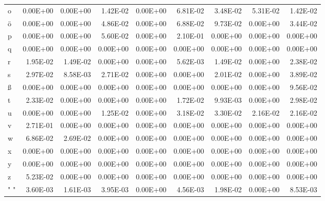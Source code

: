 \documentclass[11pt,a4paper]{CLabBookTemplate} %
\begin{document}
\begin{table}[htbp]
\begin{tabular}{lrrrrrrrr}
		o     & 0.00E+00 & 0.00E+00 & 1.42E-02 & 0.00E+00 & 6.81E-02 & 3.48E-02 & 5.31E-02 & 1.42E-02 \\
		ö     & 0.00E+00 & 0.00E+00 & 4.86E-02 & 0.00E+00 & 6.88E-02 & 9.73E-02 & 0.00E+00 & 3.44E-02 \\
		p     & 0.00E+00 & 0.00E+00 & 5.60E-02 & 0.00E+00 & 2.10E-01 & 0.00E+00 & 0.00E+00 & 0.00E+00 \\
		q     & 0.00E+00 & 0.00E+00 & 0.00E+00 & 0.00E+00 & 0.00E+00 & 0.00E+00 & 0.00E+00 & 0.00E+00 \\
		r     & 1.95E-02 & 1.49E-02 & 0.00E+00 & 0.00E+00 & 5.62E-03 & 1.49E-02 & 0.00E+00 & 2.38E-02 \\
		s     & 2.97E-02 & 8.58E-03 & 2.71E-02 & 0.00E+00 & 0.00E+00 & 2.01E-02 & 0.00E+00 & 3.89E-02 \\
		ß     & 0.00E+00 & 0.00E+00 & 0.00E+00 & 0.00E+00 & 0.00E+00 & 0.00E+00 & 0.00E+00 & 9.56E-02 \\
		t     & 2.33E-02 & 0.00E+00 & 0.00E+00 & 0.00E+00 & 1.72E-02 & 9.93E-03 & 0.00E+00 & 2.98E-02 \\
		u     & 0.00E+00 & 0.00E+00 & 1.25E-02 & 0.00E+00 & 3.18E-02 & 3.30E-02 & 2.16E-02 & 2.16E-02 \\
		v     & 2.71E-01 & 0.00E+00 & 0.00E+00 & 0.00E+00 & 0.00E+00 & 0.00E+00 & 0.00E+00 & 0.00E+00 \\
		w     & 6.86E-02 & 2.69E-02 & 0.00E+00 & 0.00E+00 & 0.00E+00 & 0.00E+00 & 0.00E+00 & 0.00E+00 \\
		x     & 0.00E+00 & 0.00E+00 & 0.00E+00 & 0.00E+00 & 0.00E+00 & 0.00E+00 & 0.00E+00 & 0.00E+00 \\
		y     & 0.00E+00 & 0.00E+00 & 0.00E+00 & 0.00E+00 & 0.00E+00 & 0.00E+00 & 0.00E+00 & 0.00E+00 \\
		z     & 5.23E-02 & 0.00E+00 & 0.00E+00 & 0.00E+00 & 0.00E+00 & 0.00E+00 & 0.00E+00 & 0.00E+00 \\
		" "   & 3.60E-03 & 1.61E-03 & 3.95E-03 & 0.00E+00 & 4.56E-03 & 1.98E-02 & 0.00E+00 & 8.53E-03 \\
	\end{tabular}%
	\label{tab:CI3}%
\end{table}%
\end{document}
